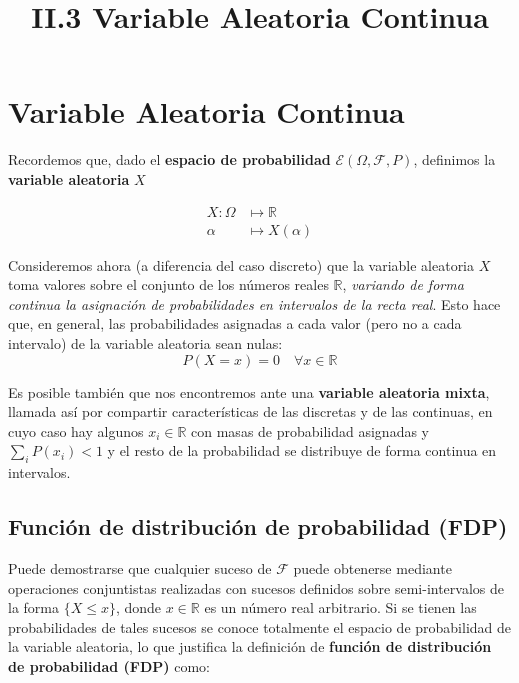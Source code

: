 \documentclass[11pt]{article}
\title{II.3 Variable Aleatoria Continua}
\begin{document}
    
    
    \maketitle
    
    

    
    \hypertarget{ii.3-variable-aleatoria-continua}{%
\section*{Variable Aleatoria
Continua}\label{ii.3-variable-aleatoria-continua}}

Recordemos que, dado el \textbf{espacio de probabilidad}
\(\mathscr{E}(\Omega, \mathscr{F}, P)\), definimos la \textbf{variable
aleatoria} \(X\)

\begin{align*}
X:  \mathscr{\Omega} & \longmapsto \mathbb{R}\\
   \alpha & \longmapsto X(\alpha)
   \end{align*}

Consideremos ahora (a diferencia del caso discreto) que la variable
aleatoria \(X\) toma valores sobre el conjunto de los números reales
\(\mathbb{R}\), \emph{variando de forma continua la asignación de
probabilidades en intervalos de la recta real}. Esto hace que, en
general, las probabilidades asignadas a cada valor (pero no a cada
intervalo) de la variable aleatoria sean nulas:
\[P(X=x)=0 \quad \forall x \in \mathbb{R}\]

Es posible también que nos encontremos ante una \textbf{variable
aleatoria mixta}, llamada así por compartir características de las
discretas y de las continuas, en cuyo caso hay algunos
\(x_i \in \mathbb{R}\) con masas de probabilidad asignadas y
\(\sum_i P(x_i) < 1\) y el resto de la probabilidad se distribuye de
forma continua en intervalos.

    \hypertarget{funciuxf3n-de-distribuciuxf3n-de-probabilidad-fdp}{%
\subsection*{Función de distribución de probabilidad
(FDP)}\label{funciuxf3n-de-distribuciuxf3n-de-probabilidad-fdp}}

Puede demostrarse que cualquier suceso de \(\mathscr{F}\) puede
obtenerse mediante operaciones conjuntistas realizadas con sucesos
definidos sobre semi-intervalos de la forma \(\{X\leq x\}\), donde
\(x \in \mathbb{R}\) es un número real arbitrario. Si se tienen las
probabilidades de tales sucesos se conoce totalmente el espacio de
probabilidad de la variable aleatoria, lo que justifica la definición de
\textbf{función de distribución de probabilidad (FDP)} como:
\end{document}
